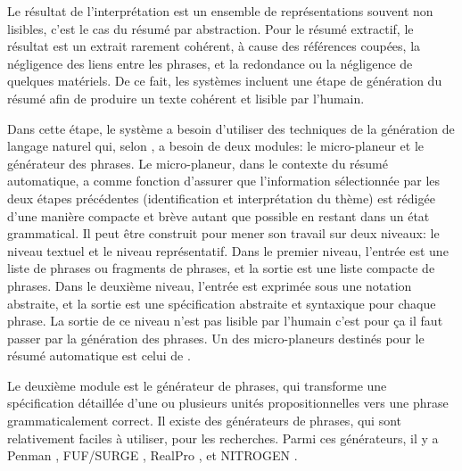 \documentclass[a4paper,12pt,oneside]{../use/ESIthesis}
\begin{document}
Le résultat de l'interprétation est un ensemble de représentations souvent non lisibles, c'est le cas du résumé par abstraction.
Pour le résumé extractif, le résultat est un extrait rarement cohérent, à cause des références coupées, la négligence des liens entre les phrases, et la redondance ou la négligence de quelques matériels. 
De ce fait, les systèmes incluent une étape de génération du résumé afin de produire un texte cohérent et lisible par l'humain. 

Dans cette étape, le système a besoin d'utiliser des techniques de la génération de langage naturel qui, selon \cite{98-hovy-lin}, a besoin de deux modules: le micro-planeur et le générateur des phrases. 
Le micro-planeur, dans le contexte du résumé automatique, a comme fonction d'assurer que l'information sélectionnée par les deux étapes précédentes (identification et interprétation du thème) est rédigée d'une manière compacte et brève autant que possible en restant dans un état grammatical. 
Il peut être construit pour mener son travail sur deux niveaux: le niveau textuel et le niveau représentatif. 
Dans le premier niveau, l'entrée est une liste de phrases ou fragments de phrases, et la sortie est une liste compacte de phrases. 
Dans le deuxième niveau, l'entrée est exprimée sous une notation abstraite, et la sortie est une spécification abstraite et syntaxique pour chaque phrase. 
La sortie de ce niveau n'est pas lisible par l'humain c'est pour ça il faut passer par la génération des phrases. 
Un des micro-planeurs destinés pour le résumé automatique est celui de \cite{95-mckeown-radev}.

Le deuxième module est le générateur de phrases, qui transforme une spécification détaillée d'une ou plusieurs unités propositionnelles vers une phrase grammaticalement correct. 
Il existe des générateurs de phrases, qui sont relativement faciles à utiliser, pour les recherches. 
Parmi ces générateurs, il y a Penman \cite{91-hovy}, FUF/SURGE \cite{92-elhadad}, RealPro \cite{97-lavoie-rambow}, et NITROGEN \cite{98-langkilde-knight}. 
\end{document}

